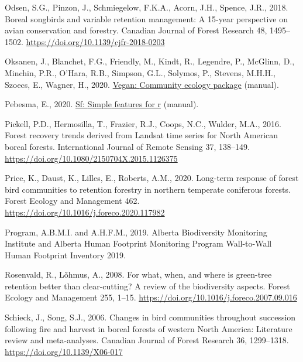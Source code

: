 \documentclass[
  12pt,
]{article}
\newlength{\cslhangindent}
\newlength{\cslentryspacingunit} %
\newenvironment{CSLReferences}[2] %
 {%
  \setlength{\parindent}{0pt}
  \ifodd #1
  \let\oldpar\par
  \def\par{\hangindent=\cslhangindent\oldpar}
  \fi
  \setlength{\parskip}{#2\cslentryspacingunit}
 }%
 {}
\begin{document}
\begin{CSLReferences}{1}{0}
\leavevmode{}%
Odsen, S.G., Pinzon, J., Schmiegelow, F.K.A., Acorn, J.H., Spence, J.R., 2018. Boreal songbirds and variable retention management: A 15-year perspective on avian conservation and forestry. Canadian Journal of Forest Research 48, 1495--1502. \url{https://doi.org/10.1139/cjfr-2018-0203}

\leavevmode{}%
Oksanen, J., Blanchet, F.G., Friendly, M., Kindt, R., Legendre, P., McGlinn, D., Minchin, P.R., O'Hara, R.B., Simpson, G.L., Solymos, P., Stevens, M.H.H., Szoecs, E., Wagner, H., 2020. \href{https://CRAN.R-project.org/package=vegan}{Vegan: {Community} ecology package} (manual).

\leavevmode{}%
Pebesma, E., 2020. \href{https://CRAN.R-project.org/package=sf}{Sf: {Simple} features for r} (manual).

\leavevmode{}%
Pickell, P.D., Hermosilla, T., Frazier, R.J., Coops, N.C., Wulder, M.A., 2016. Forest recovery trends derived from {Landsat} time series for {North} {American} boreal forests. International Journal of Remote Sensing 37, 138--149. \url{https://doi.org/10.1080/2150704X.2015.1126375}

\leavevmode{}%
Price, K., Daust, K., Lilles, E., Roberts, A.M., 2020. Long-term response of forest bird communities to retention forestry in northern temperate coniferous forests. Forest Ecology and Management 462. \url{https://doi.org/10.1016/j.foreco.2020.117982}

\leavevmode{}%
Program, A.B.M.I. and A.H.F.M., 2019. Alberta {Biodiversity} {Monitoring} {Institute} and {Alberta} {Human} {Footprint} {Monitoring} {Program} {Wall}-to-{Wall} {Human} {Footprint} {Inventory} 2019.

\leavevmode{}%
Rosenvald, R., Lõhmus, A., 2008. For what, when, and where is green-tree retention better than clear-cutting? {A} review of the biodiversity aspects. Forest Ecology and Management 255, 1--15. \url{https://doi.org/10.1016/j.foreco.2007.09.016}

\leavevmode{}%
Schieck, J., Song, S.J., 2006. Changes in bird communities throughout succession following fire and harvest in boreal forests of western {North} {America}: {Literature} review and meta-analyses. Canadian Journal of Forest Research 36, 1299--1318. \url{https://doi.org/10.1139/X06-017}


\end{CSLReferences}
\end{document}
